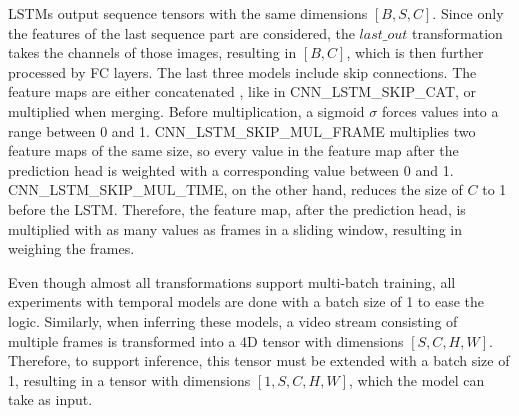 \ac{LSTM}s output sequence tensors with the same dimensions $[B, S, C]$.
Since only the features of the last sequence part are considered, the $last\_out$ transformation takes the channels of those images, resulting in $[B, C]$, which is then further processed by \ac{FC} layers.
The last three models include skip connections.
The feature maps are either concatenated \cite{pytorch_concat_docu}, like in CNN\_LSTM\_SKIP\_CAT, or multiplied when merging.
Before multiplication, a sigmoid $\sigma$ \cite{pytorch_sigmoid_docu} forces values into a range between 0 and 1.
CNN\_LSTM\_SKIP\_MUL\_FRAME multiplies two feature maps of the same size, so every value in the feature map after the prediction head is weighted with a corresponding value between 0 and 1.
CNN\_LSTM\_SKIP\_MUL\_TIME, on the other hand, reduces the size of $C$ to 1 before the \ac{LSTM}.
Therefore, the feature map, after the prediction head, is multiplied with as many values as frames in a sliding window, resulting in weighing the frames.

Even though almost all transformations support multi-batch training, all experiments with temporal models are done with a batch size of 1 to ease the logic.
Similarly, when inferring these models, a video stream consisting of multiple frames is transformed into a 4D tensor with dimensions $[S, C, H, W]$.
Therefore, to support inference, this tensor must be extended with a batch size of 1, resulting in a tensor with dimensions $[1, S, C, H, W]$, which the model can take as input.
